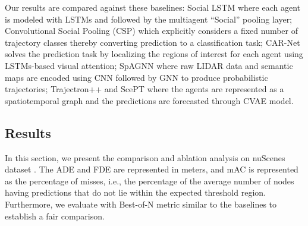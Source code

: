 \documentclass[letterpaper, 10 pt, conference]{ieeeconf}  %
\begin{document}
Our results are compared against these baselines: Social LSTM \cite{7780479} where each agent is modeled with LSTMs and followed by the multiagent “Social” pooling layer; Convolutional Social Pooling (CSP) \cite{Deo_2018} which explicitly considers a fixed number of trajectory classes thereby converting prediction to a classification task; CAR-Net \cite{sadeghian2018carnet} solves the prediction task by localizing the regions of interest for each agent using LSTMs-based visual attention; SpAGNN \cite{casas2019spatiallyaware} where raw LIDAR data and semantic maps are encoded using CNN followed by GNN to produce probabilistic trajectories; Trajectron++ \cite{salzmann2021trajectron} and ScePT \cite{chen2022scept} where the agents are represented as a spatiotemporal graph and the predictions are forecasted through CVAE model.
\subsection{Results}
In this section, we present the comparison and ablation analysis on nuScenes dataset \cite{caesar2020nuscenes}. The ADE and FDE are represented in meters, and mAC is represented as the percentage of misses,  i.e., the percentage of the average number of nodes having predictions that do not lie within the expected threshold region. Furthermore, we evaluate with Best-of-N metric similar to the baselines to establish a fair comparison.
\\
\vspace{0pt}
\end{document}
